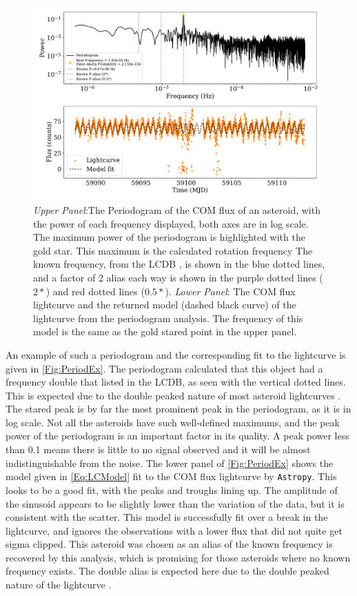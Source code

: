 \documentclass{UCreport}
\begin{document}
\begin{figure}[!t]
  \centering
  \includegraphics[width=\textwidth]{../OzData/PeriodogramUlyssesUpdated.pdf}
  \caption[Periodogram example]{\textit{Upper Panel}:The Periodogram of the COM flux of an asteroid, with the power of each frequency displayed, both axes are in log scale. 
  The maximum power of the periodogram is highlighted with the gold star. 
  This maximum is the calculated rotation frequency
  The known frequency, from the LCDB \citep{Warner2009}, is shown in the blue dotted lines, and a factor of 2 alias each way is shown in the purple dotted lines ($2*$) and red dotted lines ($0.5*$). 
  \textit{Lower Panel}: The COM flux lightcurve and the returned model (dashed black curve) of the lightcurve from the periodogram analysis. The frequency of this model is the same as the gold stared point in the upper panel.
  }
  \label{Fig:PeriodEx}
\end{figure}


An example of such a periodogram and the corresponding fit to the lightcurve is given in \autoref{Fig:PeriodEx}. 
The periodogram calculated that this object had a frequency double that listed in the LCDB, as seen with the vertical dotted lines. 
This is expected due to the double peaked nature of most asteroid lightcurves \citep{McNeill2023}.  
The stared peak is by far the most prominent peak in the periodogram, as it is in log scale.
Not all the asteroids have such well-defined maximums, and the peak power of the periodogram is an important factor in its quality.
A peak power less than 0.1 means there is little to no signal observed and it will be almost indistinguishable from the noise.
The lower panel of \autoref{Fig:PeriodEx} shows the model given in \autoref{Eq:LCModel} fit to the COM flux lightcurve by \texttt{Astropy}.
This looks to be a good fit, with the peaks and troughs lining up.
The amplitude of the sinusoid appears to be slightly lower than the variation of the data, but it is consistent with the scatter.
This model is successfully fit over a break in the lightcurve, and ignores the observations with a lower flux that did not quite get sigma clipped.
This asteroid was chosen as an alias of the known frequency is recovered by this analysis, which is promising for those asteroids where no known frequency exists. 
The double alias is expected here due to the double peaked nature of the lightcurve \citep{McNeill2023}.   
\end{document}
